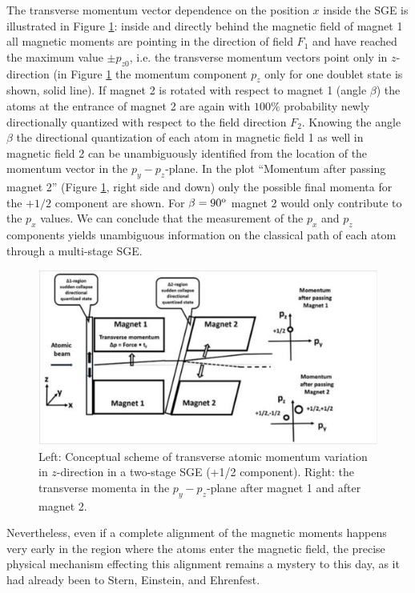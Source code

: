 \documentclass[12pt]{article}
\begin{document}
The transverse momentum vector dependence on the position $x$ inside the SGE is illustrated in Figure \ref{fig:SGEtwostage}: inside and directly behind the magnetic field of magnet 1 all magnetic moments are pointing in the direction of field $F_1$ and have reached the maximum value $\pm p_{z0}$, i.e. the transverse momentum vectors point only in $z$-direction (in Figure \ref{fig:SGEtwostage} the momentum component $p_z$  only for one doublet state is shown, solid line). If magnet 2 is rotated with respect to magnet 1 (angle $\beta$) the atoms at the entrance of magnet 2 are again with $100\%$ probability newly directionally quantized with respect to the field direction $F_2$. Knowing the angle $\beta$ the directional quantization of each atom in magnetic field 1 as well in magnetic field 2 can be unambiguously identified from the location of the momentum vector in the $p_y-p_z$-plane. In the plot ``Momentum after passing magnet 2'' (Figure \ref{fig:SGEtwostage}, right side and down) only the possible final momenta for the $+1/2$ component are shown. For $\beta=90^{\rm o}$ magnet 2 would only contribute to the $p_x$ values. We can conclude that the measurement of the $p_x$ and $p_z$ components yields unambiguous information on the classical path of each atom through a multi-stage SGE. 
%
\begin{figure}
\begin{center}
\includegraphics[scale=0.4]{figures/SGE_twostage}
\caption{Left: Conceptual scheme of transverse atomic momentum variation in $z$-direction in a two-stage SGE (+1/2 component). Right: the transverse momenta in the $p_y-p_z$-plane after magnet 1 and after magnet 2. }
\label{fig:SGEtwostage}
\end{center}
\end{figure}
%

Nevertheless, even if a complete alignment of the magnetic moments happens very early in the region where the atoms enter the magnetic field, the precise physical mechanism effecting this alignment remains a mystery to this day, as it had already been to Stern, Einstein, and Ehrenfest.
\end{document}
